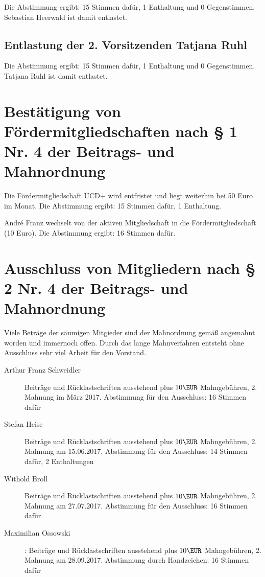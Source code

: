 \documentclass[a4paper,12pt,titlepage]{scrartcl}
\begin{document}
Die Abstimmung ergibt: 15 Stimmen dafür, 1 Enthaltung und 0 Gegenstimmen. Sebastian Heerwald ist damit entlastet.

\subsection{Entlastung der 2. Vorsitzenden Tatjana Ruhl}
Die Abstimmung ergibt: 15 Stimmen dafür, 1 Enthaltung und 0 Gegenstimmen. Tatjana Ruhl ist damit entlastet.

\section{Bestätigung von Fördermitgliedschaften nach § 1 Nr. 4 der Beitrags- und Mahnordnung}

Die Fördermitgliedschaft UCD+ wird entfristet und liegt weiterhin bei 50 Euro im Monat.
Die Abstimmung ergibt: 15 Stimmen dafür, 1 Enthaltung.

André Franz wechselt von der aktiven Mitgliedschaft in die Fördermitgliedschaft (10 Euro). Die Abstimmung ergibt: 16 Stimmen dafür.

\section{ Ausschluss von Mitgliedern nach § 2 Nr. 4 der Beitrags- und Mahnordnung }

Viele Beträge der säumigen Mitgieder sind der Mahnordnung gemäß angemahnt worden und immernoch offen. Durch das lange Mahnverfahren entsteht ohne Ausschluss sehr viel Arbeit für den Vorstand.

\begin{description}

\item[Arthur Franz Schweidler] Beiträge und Rücklastschriften ausstehend plus $10\EUR$ Mahngebühren, 2. Mahnung im März 2017. Abstimmung für den Ausschluss: 16 Stimmen dafür
\item[Stefan Heise] Beiträge und Rücklastschriften ausstehend plus $10\EUR$ Mahngebühren, 2. Mahnung am 15.06.2017. Abstimmung für den Ausschluss: 14 Stimmen dafür, 2 Enthaltungen
\item[Withold Broll] Beiträge und Rücklastschriften ausstehend plus $10\EUR$ Mahngebühren, 2. Mahnung am 27.07.2017. Abstimmung für den Ausschluss: 16 Stimmen dafür
\item[Maximilian Ossowski]: Beiträge und Rücklastschriften ausstehend plus $10\EUR$ Mahngebühren, 2. Mahnung am 28.09.2017. Abstimmung durch Handzeichen: 16 Stimmen dafür
\end{description}
\end{document}
